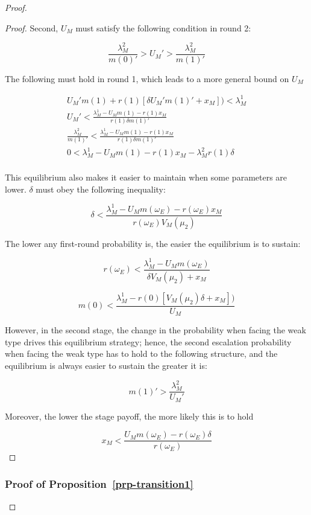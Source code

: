\documentclass[
  12pt,
]{article}
\theoremstyle{plain}
\theoremstyle{plain}
\theoremstyle{remark}
\begin{document}
\begin{proof}
\begin{proof}
Second, \(U_M\) must satisfy the following condition in round 2:

\[
\frac{\lambda_M^2}{m(0)'}> U_M' > \frac{\lambda_M^2}{m(1)'}
\]

The following must hold in round 1, which leads to a more general bound
on \(U_M\)

\[
\begin{aligned}
U_M' m(1) + r(1)[\delta U_M' m(1)' + x_M]) < \lambda_M^1\\
U_M' < \frac{\lambda_M^1- U_M m(1) - r(1) x_M}{r(1) \delta m(1)'} \\
\frac{\lambda_M^2}{m(1)'} < \frac{\lambda_M^1 - U_M m(1) - r(1) x_M}{r(1) \delta m(1)'} \\
0 < \lambda_M^1 - U_M m(1) - r(1) x_M - \lambda_M^2 r(1) \delta \\
\end{aligned}
\]

This equilibrium also makes it easier to maintain when some parameters
are lower. \(\delta\) must obey the following inequality:

\[
\delta < \frac{\lambda_M^1 - U_M m(\omega_E) - r(\omega_E) x_M}{r(\omega_E) V_M(\mu_2)}
\]

The lower any first-round probability is, the easier the equilibrium is
to sustain:

\[
r(\omega_E) < \frac{\lambda_M^1- U_M m(\omega_E)}{\delta V_M(\mu_2) + x_M}
\]

\[
m(0) <  \frac{\lambda_M^1 - r(0)[V_M(\mu_2) \delta + x_M])}{U_M}
\]

However, in the second stage, the change in the probability when facing
the weak type drives this equilibrium strategy; hence, the second
escalation probability when facing the weak type has to hold to the
following structure, and the equilibrium is always easier to sustain the
greater it is:

\[
m(1)' > \frac{\lambda_M^2}{U_M'}
\]

Moreover, the lower the stage payoff, the more likely this is to hold

\[
x_M < \frac{U_M m(\omega_E) - r(\omega_E) \delta}{r(\omega_E)}
\]
\end{proof}

\subsubsection{\texorpdfstring{Proof of
Proposition~\ref{prp-transition1}}{Proof of Proposition~}}\label{proof-of-prp-transition1}


\end{proof}
\end{document}
